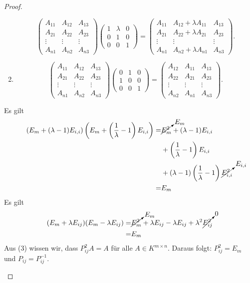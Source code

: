 \begin{proof}
\begin{parts}
\begin{enumerate}[label=(\arabic*)]
\[			\begin{pmatrix} A_{11} & A_{12} & A_{13} \\ A_{21} & A_{22} & A_{23} \\ \vdots & \vdots & \vdots \\ A_{n 1} & A_{n 2}& A_{n 3} \end{pmatrix} \begin{pmatrix} 1 & \lambda & 0 \\ 0 & 1 & 0 \\ 0 & 0 & 1 \end{pmatrix}=\begin{pmatrix} A_{11} & A_{12} +\lambda A_{11} & A_{13} \\ A_{21} & A_{22}+\lambda A_{21} & A_{23} \\ \vdots & \vdots & \vdots \\ A_{n 1} & A_{n 2}+\lambda A_{n 1} & A_{n 3} \end{pmatrix}  
		.\] 
	\item 
			\[\begin{pmatrix} A_{11} & A_{12} & A_{13} \\ A_{21} & A_{22} & A_{23} \\ \vdots & \vdots & \vdots \\ A_{n 1} & A_{n 2}& A_{n 3} \end{pmatrix} \begin{pmatrix} 0 & 1 & 0 \\ 1 & 0 & 0 \\ 0 & 0 & 1 \end{pmatrix}=\begin{pmatrix}A_{12} & A_{11} & A_{13} \\ A_{22} & A_{21} & A_{23} \\ \vdots & \vdots & \vdots \\ A_{n 2} & A_{n 1}& A_{n 3}  \end{pmatrix} .\] 
		\end{enumerate}
	\item Es gilt
\begin{align*}
	(E_m+(\lambda -1)E_{i,i})\left( E_m+\left( \frac{1}{\lambda}-1 \right) E_{i,i} \right) =&\cancelto{E_m}{E_m^2}+(\lambda-1)E_{i,i}\\&+\left( \frac{1}{\lambda}-1 \right)E_{i,i}\\&+(\lambda -1)\left( \frac{1}{\lambda}-1 \right) \cancelto{E_{i,i}}{E_{i,i}^2}\\
	=&E_m
\end{align*} 
Es gilt
\begin{align*}
	(E_m+\lambda E_{ij})(E_m-\lambda E_{ij})=&\cancelto{E_m}{E_m^2}+\lambda E_{ij}-\lambda E_{ij}+\lambda^2 \cancelto{0}{E_{ij}^2}\\
	=& E_m
\end{align*}
Aus (3) wissen wir, dass $P_{ij}^2 A=A$ f\"{u}r alle $A\in K^{m\times n}$. Daraus folgt: $P_{ij}^2=E_m$ und $P_{ij}=P_{ij}^{-1}$.\qedhere
	\end{parts}
\end{proof}
